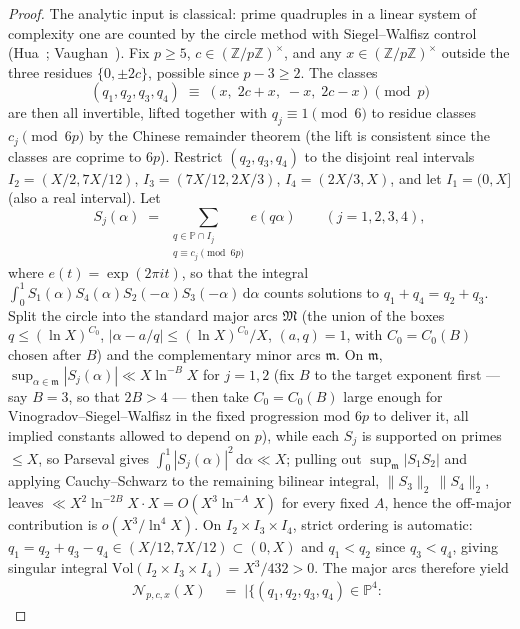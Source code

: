 \documentclass[11pt]{article}
\theoremstyle{plain}
\theoremstyle{definition}
\newcommand{\dd}{\mathrm{d}}
\begin{document}
\begin{proof}
The analytic input is classical: prime quadruples in a linear
system of complexity one are counted by the circle method with
Siegel--Walfisz control (Hua~\cite{hua};
Vaughan~\cite[Ch.~3]{vaughan}). Fix $p \ge 5$,
$c \in (\mathbb{Z}/p\mathbb{Z})^{\times}$, and any
$x \in (\mathbb{Z}/p\mathbb{Z})^{\times}$ outside the three
residues $\{0, \pm 2c\}$, possible since $p - 3 \ge 2$. The
classes
\[
(q_1, q_2, q_3, q_4) \;\equiv\; (x,\; 2c + x,\; -x,\; 2c - x)
\pmod p
\]
are then all invertible, lifted together with
$q_j \equiv 1 \pmod 6$ to residue classes $c_j \pmod{6p}$ by the
Chinese remainder theorem (the lift is consistent since the classes
are coprime to $6p$). Restrict $(q_2, q_3, q_4)$ to the disjoint
real intervals $I_2 = (X/2, 7X/12)$, $I_3 = (7X/12, 2X/3)$,
$I_4 = (2X/3, X)$, and let $I_1 = (0, X]$ (also a real
interval). Let
\[
S_j(\alpha) \;=\; \sum_{\substack{q \in \mathbb{P} \cap I_j \\
q \equiv c_j \pmod{6p}}} e(q\alpha) \qquad (j = 1,2,3,4),
\]
where $e(t) = \exp(2\pi i t)$, so that the integral
$\int_0^1 S_1(\alpha) S_4(\alpha) S_2(-\alpha) S_3(-\alpha)\,\dd\alpha$
counts solutions to $q_1 + q_4 = q_2 + q_3$. Split the circle into
the standard major arcs $\mathfrak{M}$ (the union of the boxes
$q \le (\ln X)^{C_0}$, $|\alpha - a/q| \le (\ln X)^{C_0}/X$,
$(a, q) = 1$, with $C_0 = C_0(B)$ chosen after $B$) and the
complementary
minor arcs $\mathfrak{m}$. On
$\mathfrak{m}$, $\sup_{\alpha \in \mathfrak{m}} |S_j(\alpha)| \ll X
\ln^{-B} X$ for $j = 1, 2$ (fix $B$ to the target exponent
first --- say $B = 3$, so that $2B > 4$ --- then take
$C_0 = C_0(B)$ large enough for Vinogradov--Siegel--Walfisz in the
fixed progression mod $6p$ to deliver it, all implied constants
allowed to depend on $p$), while each $S_j$ is supported on primes
$\le X$, so Parseval gives $\int_0^1 |S_j(\alpha)|^2\,\dd\alpha \ll X$;
pulling out $\sup_{\mathfrak{m}} |S_1 S_2|$ and applying
Cauchy--Schwarz to the remaining bilinear integral,
$\|S_3\|_2\,\|S_4\|_2$, leaves
$\ll X^{2}\ln^{-2B} X \cdot X = O(X^{3}\ln^{-A} X)$ for every
fixed $A$, hence the off-major contribution is
$o(X^{3}/\ln^{4} X)$. On $I_2 \times I_3 \times I_4$, strict
ordering is automatic:
$q_1 = q_2 + q_3 - q_4 \in (X/12, 7X/12) \subset (0, X)$ and
$q_1 < q_2$ since $q_3 < q_4$, giving singular integral
$\mathrm{Vol}(I_2 \times I_3 \times I_4) = X^{3}/432 > 0$. The
major arcs therefore yield
\begin{align*}
\mathcal{N}_{p, c, x}(X)
&\;=\; \bigl|\bigl\{(q_1,q_2,q_3,q_4) \in \mathbb{P}^{4} :\;

\end{align*}
\end{proof}
\end{document}
